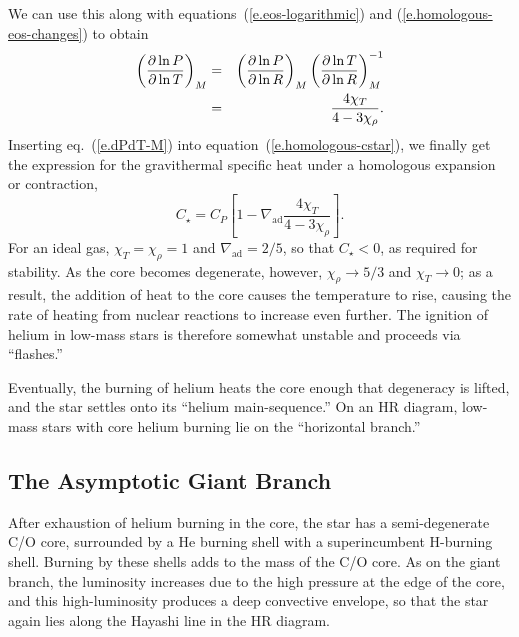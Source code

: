 We can use this along with equations~(\ref{e.eos-logarithmic}) and (\ref{e.homologous-eos-changes}) to obtain
\begin{eqnarray}\label{e.dPdT-M}
 \left(\frac{\partial \ln P}{\partial \ln T}\right)_{M} &=& \left(\frac{\partial \ln P}{\partial \ln R}\right)_{M}\left(\frac{\partial \ln T}{\partial \ln R}\right)_{M}^{-1}\nonumber \\
 &=& \frac{4\chi_{T}}{4-3\chi_{\rho}}.
\end{eqnarray}
Inserting eq.~(\ref{e.dPdT-M}) into equation~(\ref{e.homologous-cstar}), we finally get the expression for the gravithermal specific heat under a homologous expansion or contraction,
\begin{equation}\label{e.gravithermal-specific-heat}
	C_{\star} = C_{P}\left[1 - \nabla_{\mathrm{ad}}\frac{4\chi_{T}}{4 - 3\chi_{\rho}}\right].
\end{equation}
For an ideal gas, $\chi_{T}=\chi_{\rho}=1$ and $\nabla_{\mathrm{ad}} = 2/5$, so that $C_{\star} < 0$, as required for stability.  As the core becomes degenerate, however, $\chi_{\rho} \to 5/3$ and $\chi_{T}\to 0$; as a result, the addition of heat to the core causes the temperature to rise, causing the rate of heating from nuclear reactions to increase even further.  The ignition of helium in low-mass stars is therefore somewhat unstable and proceeds via ``flashes.''

Eventually, the burning of helium heats the core enough that degeneracy is lifted, and the star settles onto its ``helium main-sequence.''  On an HR diagram, low-mass stars with core helium burning lie on the ``horizontal branch.''

\subsection{The Asymptotic Giant Branch}\label{s.agb}

After exhaustion of helium burning in the core, the star has a semi-degenerate C/O core, surrounded by a He burning shell with a superincumbent H-burning shell.  Burning by these shells adds to the mass of the C/O core. As on the giant branch, the luminosity increases due to the high pressure at the edge of the core, and this high-luminosity produces a deep convective envelope, so that the star again lies along the Hayashi line in the HR diagram. 

